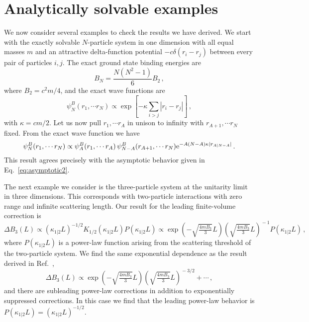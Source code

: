 \documentclass[aps,singlecolumn,superscriptaddress,nofootinbib,tightenlines,
preprintnumbers,showkeys]{revtex4-1}
\newcommand{\ee}{\mathrm{e}}
\begin{document}
\section{Analytically solvable examples}

We now consider several examples to check the results we have derived.
We start with the exactly solvable $N$-particle system in one dimension with all 
equal masses $m$ and an attractive delta-function potential ${-}c\delta(r_i - 
r_j)$ between every pair of particles $i,j$.  The exact ground state binding 
energies are
%
\begin{equation}
 B_N = \frac{N(N^2-1)}{6}B_2 \,,
\end{equation}
%
where $B_2=c^2m/4$, and the exact wave functions are
%
\begin{equation}
 \psi^B_N (r_1,\cdots r_N)
 \propto \exp\!\left[-\kappa\sum_{i>j}|r_i-r_j|\right] \,,
\end{equation}
%
with $\kappa = cm/2$.  Let us now pull $r_1,\cdots r_A$ in unison to infinity 
with $r_{A+1},\cdots r_N$ fixed.  From the exact wave function we have
%
\begin{equation}
 \psi^B_N (r_1,\cdots r_N) \propto \psi^B_{A} (r_1,\cdots r_A) \, \psi^B_{N-A}
 (r_{A+1},\cdots r_N)
 \null \ee^{-A(N-A)\kappa|r_{A|N-A}|} \,.
\end{equation}
%
This result agrees precisely with the asymptotic behavior given in 
Eq.~\eqref{eq:asymptotic2}.

\medskip
The next example we consider is the three-particle system at the unitarity
limit in three dimensions.  This corresponds with two-particle interactions with
zero range and infinite scattering length.  Our result for the leading 
finite-volume correction is
%
\begin{equation}
 \Delta B_3(L) \propto (\kappa_{1|2}L)^{-1/2} 
 K_{1/2}(\kappa_{1|2}L)P(\kappa_{1|2}L)
 \propto\exp\!\left({-}\sqrt{\tfrac{4mB_3}{3}}L\right)
 \left({\sqrt{\tfrac{4mB_3}{3}}L}\right)^{\!{-}1}P(\kappa_{1|2}L) \,,
\end{equation}
%
where $P(\kappa_{1|2}L)$ is a power-law function arising from the scattering
threshold of the two-particle system.  We find the same exponential dependence
as the result derived in Ref.~\cite{Meissner:2014dea},
%
\begin{equation}
 \Delta B_3(L) \propto 
 \exp\!\left({-}\sqrt{\tfrac{4mB_3}{3}}L\right)\left({\sqrt{\tfrac{4mB_3}{3}}L}
\right)^{\!{-}3/2}+\cdots \,,
\end{equation}
%
and there are subleading power-law corrections in addition to exponentially
suppressed corrections.  In this case we find that the leading power-law
behavior is $P(\kappa_{1|2}L)=(\kappa_{1|2}L)^{-1/2}$.
\end{document}
